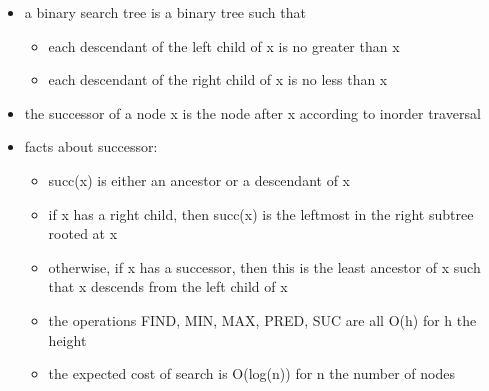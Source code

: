\documentclass[
]{article}
\providecommand{\tightlist}{%
  \setlength{\itemsep}{0pt}\setlength{\parskip}{0pt}}
\begin{document}
\begin{itemize}
\tightlist
\item
  a binary search tree is a binary tree such that

  \begin{itemize}
  \tightlist
  \item
    each descendant of the left child of x is no greater than x
  \item
    each descendant of the right child of x is no less than x
  \end{itemize}
\item
  the successor of a node x is the node after x according to inorder
  traversal
\item
  facts about successor:

  \begin{itemize}
  \tightlist
  \item
    succ(x) is either an ancestor or a descendant of x
  \item
    if x has a right child, then succ(x) is the leftmost in the right
    subtree rooted at x
  \item
    otherwise, if x has a successor, then this is the least ancestor of
    x such that x descends from the left child of x
  \item
    the operations FIND, MIN, MAX, PRED, SUC are all O(h) for h the
    height
  \item
    the expected cost of search is O(log(n)) for n the number of nodes
  \end{itemize}
\end{itemize}
\end{document}

